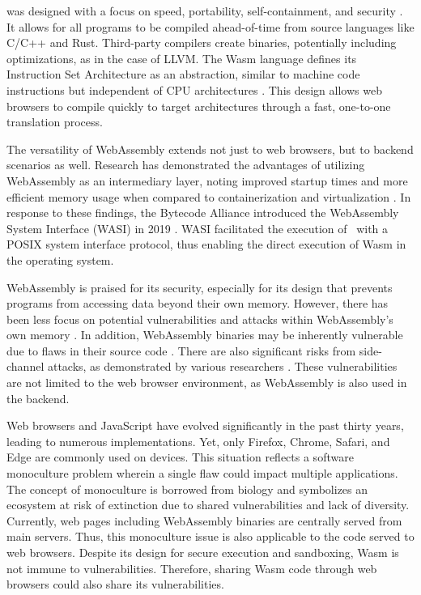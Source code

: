 
\Wasm was designed with a focus on speed, portability, self-containment, and security \cite{Haas_2017}.
It allows for all programs to be compiled ahead-of-time from source languages like C/C++ and Rust.
Third-party compilers create \Wasm binaries, potentially including optimizations, as in the case of LLVM.
The Wasm language defines its Instruction Set Architecture as an abstraction, similar to machine code instructions but independent of CPU architectures \cite{wasm_spec}.
This design allows web browsers to compile quickly to target architectures through a fast, one-to-one translation process.

The versatility of WebAssembly extends not just to web browsers, but to backend scenarios as well. 
Research has demonstrated the advantages of utilizing WebAssembly as an intermediary layer, noting improved startup times and more efficient memory usage when compared to containerization and virtualization \cite{pMendkiServerless, 1244493Jacobsson}. 
In response to these findings, the Bytecode Alliance introduced the WebAssembly System Interface (WASI) in 2019 \cite{bytecodealliance, WASI}. 
WASI facilitated the execution of \Wasm\ with a POSIX system interface protocol, thus enabling the direct execution of Wasm in the operating system. 



WebAssembly is praised for its security, especially for its design that prevents programs from accessing data beyond their own memory. 
However, there has been less focus on potential vulnerabilities and attacks within WebAssembly's own memory \cite{usenixWasm2020}.
In addition, WebAssembly binaries may be inherently vulnerable due to flaws in their source code \cite{DeRoover2022}. 
There are also significant risks from side-channel attacks, as demonstrated by various researchers \cite{ret2spec, 10.1145/3488932.3517411, Swivel}. 
These vulnerabilities are not limited to the web browser environment, as WebAssembly is also used in the backend.


Web browsers and JavaScript have evolved significantly in the past thirty years, leading to numerous implementations. 
Yet, only Firefox, Chrome, Safari, and Edge are commonly used on devices.
This situation reflects a software monoculture problem wherein a single flaw could impact multiple applications. 
The concept of monoculture is borrowed from biology and symbolizes an ecosystem at risk of extinction due to shared vulnerabilities and lack of diversity. 
Currently, web pages including WebAssembly binaries are centrally served from main servers. 
Thus, this monoculture issue is also applicable to the \Wasm code served to web browsers. 
Despite its design for secure execution and sandboxing, Wasm is not immune to vulnerabilities. 
Therefore, sharing Wasm code through web browsers could also share its vulnerabilities. 

